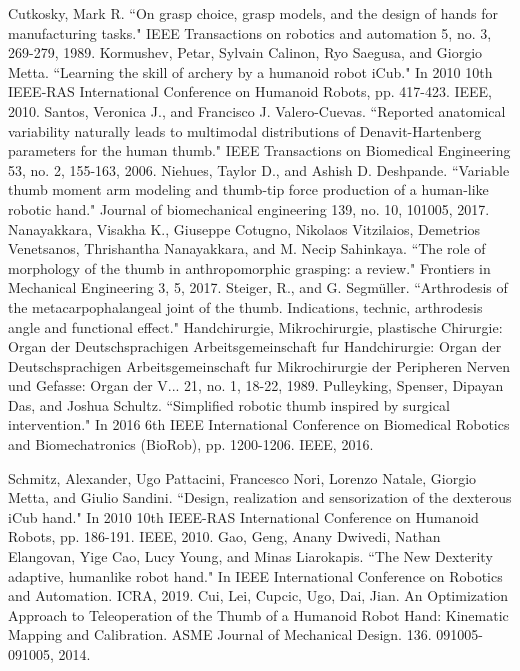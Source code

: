 \documentclass[letterpaper, 10 pt, conference]{ieeeconf}
\begin{document}
\begin{thebibliography}{99}

Cutkosky, Mark R. ``On grasp choice, grasp models, and the design of hands for manufacturing tasks." IEEE Transactions on robotics and automation 5, no. 3, 269-279,  1989.
Kormushev, Petar, Sylvain Calinon, Ryo Saegusa, and Giorgio Metta. ``Learning the skill of archery by a humanoid robot iCub." In 2010 10th IEEE-RAS International Conference on Humanoid Robots, pp. 417-423. IEEE, 2010.
 Santos, Veronica J., and Francisco J. Valero-Cuevas. ``Reported anatomical variability naturally leads to multimodal distributions of Denavit-Hartenberg parameters for the human thumb." IEEE Transactions on Biomedical Engineering 53, no. 2, 155-163, 2006.
 Niehues, Taylor D., and Ashish D. Deshpande. ``Variable thumb moment arm modeling and thumb-tip force production of a human-like robotic hand." Journal of biomechanical engineering 139, no. 10,  101005, 2017.
 Nanayakkara, Visakha K., Giuseppe Cotugno, Nikolaos Vitzilaios, Demetrios Venetsanos, Thrishantha Nanayakkara, and M. Necip Sahinkaya. ``The role of morphology of the thumb in anthropomorphic grasping: a review." Frontiers in Mechanical Engineering 3, 5, 2017.
Steiger, R., and G. Segmüller. ``Arthrodesis of the metacarpophalangeal joint of the thumb. Indications, technic, arthrodesis angle and functional effect." Handchirurgie, Mikrochirurgie, plastische Chirurgie: Organ der Deutschsprachigen Arbeitsgemeinschaft fur Handchirurgie: Organ der Deutschsprachigen Arbeitsgemeinschaft fur Mikrochirurgie der Peripheren Nerven und Gefasse: Organ der V... 21, no. 1, 18-22, 1989.
Pulleyking, Spenser, Dipayan Das, and Joshua Schultz. ``Simplified robotic thumb inspired by surgical intervention." In 2016 6th IEEE International Conference on Biomedical Robotics and Biomechatronics (BioRob), pp. 1200-1206. IEEE, 2016.

Schmitz, Alexander, Ugo Pattacini, Francesco Nori, Lorenzo Natale, Giorgio Metta, and Giulio Sandini. ``Design, realization and sensorization of the dexterous iCub hand." In 2010 10th IEEE-RAS International Conference on Humanoid Robots, pp. 186-191. IEEE, 2010.
Gao, Geng, Anany Dwivedi, Nathan Elangovan, Yige Cao, Lucy Young, and Minas Liarokapis. ``The New Dexterity adaptive, humanlike robot hand." In IEEE International Conference on Robotics and Automation. ICRA, 2019.
Cui, Lei, Cupcic, Ugo, Dai, Jian.  An Optimization Approach to Teleoperation of the Thumb of a Humanoid Robot Hand: Kinematic Mapping and Calibration. ASME Journal of Mechanical Design. 136. 091005-091005, 2014.


\end{thebibliography}
\end{document}
